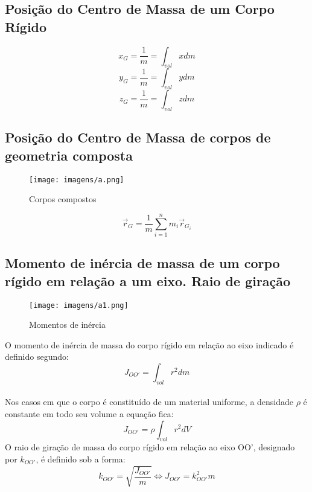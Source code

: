 \documentclass[a4paper, 12pt]{article}
\begin{document}
	\subsection{Posição do Centro de Massa de um Corpo Rígido}
		\begin{equation}
			x_G = \frac{1}{m} = \int_{vol}xdm
		\end{equation}
		\begin{equation}
			y_G = \frac{1}{m} = \int_{vol}ydm
		\end{equation}
		\begin{equation}
			z_G = \frac{1}{m} = \int_{vol}zdm
		\end{equation}
	\subsection{Posição do Centro de Massa de corpos de geometria composta}
		\begin{figure}[h]
			\center
			\texttt{[image: imagens/a.png]} 
			\caption{Corpos compostos}
		\end{figure}	
		\newpage
		\begin{equation}
			\vec{r}_G = \frac{1}{m}\sum^n_{i = 1}m_i\vec{r}_{G_i}
		\end{equation}
	\subsection{Momento de inércia de massa de um corpo rígido em relação a um eixo. Raio de giração}
		\begin{figure}[h]
			\center
			\texttt{[image: imagens/a1.png]} 
			\caption{Momentos de inércia}
		\end{figure}	
		O momento de inércia de massa do corpo rígido em relação ao eixo indicado é definido segundo:	
		\begin{equation}
			J_{OO'} = \int_{vol}r^2dm
		\end{equation}\\
		Nos casos em que o corpo é constituído de um material uniforme, a densidade $\rho$ é constante em todo seu volume a equação fica:
		\begin{equation}
			J_{OO'} = \rho \int_{vol}r^2dV
		\end{equation}
		O raio de giração de massa do corpo rígido em relação ao eixo OO', designado por $k_{OO'}$, é definido sob a forma:
		\begin{equation}
			k_{OO'} = \sqrt{\frac{J_{OO'}}{m}} \Leftrightarrow J_{OO'} = k^2_{OO'}m
		\end{equation}
	\newpage
\end{document}
